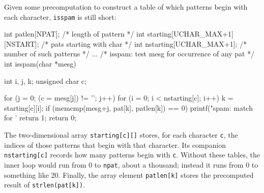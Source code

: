 Given some precomputation to construct a table of which patterns begin with
each character, \verb'isspam' is still short:
\begin{wellcode}
    int patlen[NPAT];                   /* length of pattern */
    int starting[UCHAR_MAX+1][NSTART];  /* pats starting with char */
    int nstarting[UCHAR_MAX+1];         /* number of such patterns */
    ...
    /* isspam: test mesg for occurrence of any pat */
    int isspam(char *mesg)
    {
        int i, j, k;
        unsigned char c;

        for (j = 0; (c = mesg[j]) != '\0'; j++) {
            for (i = 0; i < nstarting[c]; i++) {
                k = starting[c][i];
                if (memcmp(mesg+j, pat[k], patlen[k]) == 0) {
                    printf("spam: match for '%
                    return 1;
                }
            }
        }
        return 0;
    }
\end{wellcode}
The two-dimensional array \verb'starting[c][]' stores, for each character
\verb'c', the indices of those patterns that begin with that character. Its
companion \verb'nstarting[c]' records how many patterns begin with
\verb'c'. Without these tables, the inner loop would run from 0 to
\verb'npat', about a thousand; instead it runs from 0 to something like 20.
Finally, the array element \verb'patlen[k]' stores the precomputed result
of \verb'strlen(pat[k])'.

